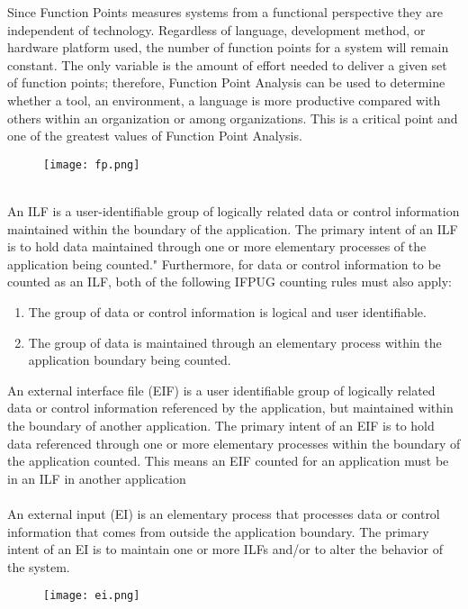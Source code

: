 \documentclass[12pt, oneside]{book}   	%
\begin{document}
Since Function Points measures systems from a functional perspective they are independent of technology. Regardless of language, development method, or hardware platform used, the number of function points for a system will remain constant. The only variable is the amount of effort needed to deliver a given set of function points; therefore, Function Point Analysis can be used to determine whether a tool, an environment, a language is more productive compared with others within an organization or among organizations. This is a critical point and one of the greatest values of Function Point Analysis.
\begin{figure}[h]
\centering
\texttt{[image: fp.png]}
\end{figure}
\\
An ILF is a user-identifiable group of logically related data or control information maintained within the boundary of the application. The primary intent of an ILF is to hold data maintained through one or more elementary processes of the application being counted."
Furthermore, for data or control information to be counted as an ILF, both of the following IFPUG counting rules must also apply:
\begin{enumerate}
\item The group of data or control information is logical and user identifiable.
\item The group of data is maintained through an elementary process within the application boundary being counted.
\end{enumerate}
An external interface file (EIF) is a user identifiable group of logically related data or control information referenced by the application, but maintained within the boundary of another application. The primary intent of an EIF is to hold data referenced through one or more elementary processes within the boundary of the application counted. This means an EIF counted for an application must be in an ILF in another application
\\ \\
An external input (EI) is an elementary process that processes data or control information that comes from outside the application boundary. The primary intent of an EI is to maintain one or more ILFs and/or to alter the behavior of the system.
\begin{figure}[h]
\centering
\texttt{[image: ei.png]}
\end{figure}
\\ \\
\end{document}
